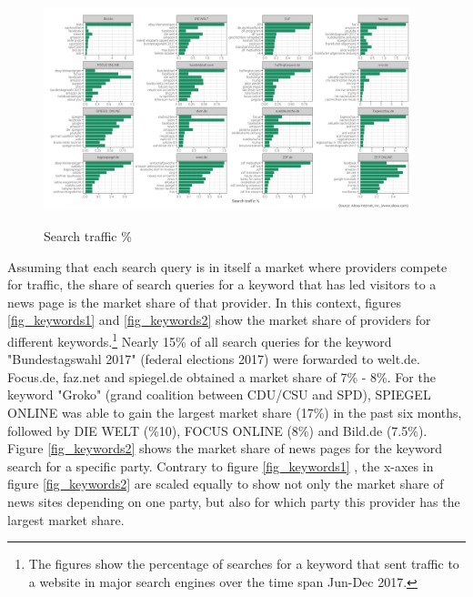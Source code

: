\documentclass[12pt,a4paper,notitlepage]{article}
\begin{document}
\begin{figure}[H]
	\caption{Search traffic \%}
	\begin{center}
		\includegraphics[width=0.95\textwidth]{../figs/search_traffic.png}
		\label{fig_searchtraffic}
	\end{center}
\end{figure}

Assuming that each search query is in itself a market where providers compete for traffic, the share of search queries for a keyword that has led visitors to a news page is the market share of that provider. In this context, figures \ref{fig_keywords1} and \ref{fig_keywords2} show the market share of providers for different keywords.\footnote{The figures show the percentage of searches for a keyword that sent traffic to a website in major search engines over the time span Jun-Dec 2017.} Nearly 15\% of all search queries for the keyword "Bundestagswahl 2017" (federal elections 2017) were forwarded to welt.de. Focus.de, faz.net and spiegel.de obtained a market share of 7\% - 8\%. For the keyword "Groko" (grand coalition between CDU/CSU and SPD), SPIEGEL ONLINE was able to gain the largest market share (17\%) in the past six months, followed by DIE WELT (\%10), FOCUS ONLINE (8\%) and Bild.de (7.5\%). Figure \ref{fig_keywords2} shows the market share of news pages for the keyword search for a specific party. Contrary to figure \ref{fig_keywords1} , the x-axes in figure \ref{fig_keywords2} are scaled equally to show not only the market share of news sites depending on one party, but also for which party this provider has the largest market share. 
\end{document}
